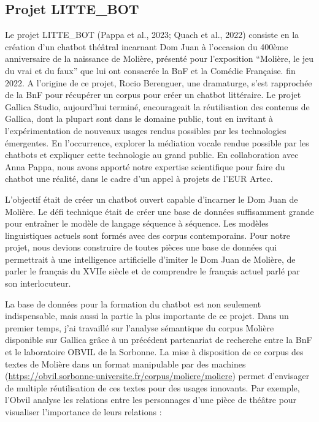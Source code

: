 \documentclass[
  a4paper,
  DIV=11,
  numbers=noendperiod]{scrreprt}
\begin{document}
\subsection{Projet LITTE\_BOT}\label{sec-projetLitteBot}

Le projet LITTE\_BOT (Pappa et al., 2023; Quach et al., 2022) consiste
en la création d'un chatbot théâtral incarnant Dom Juan à l'occasion du
400ème anniversaire de la naissance de Molière, présenté pour
l'exposition ``Molière, le jeu du vrai et du faux'' que lui ont
consacrée la BnF et la Comédie Française. fin 2022. A l'origine de ce
projet, Rocio Berenguer, une dramaturge, s'est rapprochée de la BnF pour
récupérer un corpus pour créer un chatbot littéraire. Le projet Gallica
Studio, aujourd'hui terminé, encourageait la réutilisation des contenus
de Gallica, dont la plupart sont dans le domaine public, tout en
invitant à l'expérimentation de nouveaux usages rendus possibles par les
technologies émergentes. En l'occurrence, explorer la médiation vocale
rendue possible par les chatbots et expliquer cette technologie au grand
public. En collaboration avec Anna Pappa, nous avons apporté notre
expertise scientifique pour faire du chatbot une réalité, dans le cadre
d'un appel à projets de l'EUR Artec.

L'objectif était de créer un chatbot ouvert capable d'incarner le Dom
Juan de Molière. Le défi technique était de créer une base de données
suffisamment grande pour entraîner le modèle de langage séquence à
séquence. Les modèles linguistiques actuels sont formés avec des corpus
contemporains. Pour notre projet, nous devions construire de toutes
pièces une base de données qui permettrait à une intelligence
artificielle d'imiter le Dom Juan de Molière, de parler le français du
XVIIe siècle et de comprendre le français actuel parlé par son
interlocuteur.

La base de données pour la formation du chatbot est non seulement
indispensable, mais aussi la partie la plus importante de ce projet.
Dans un premier temps, j'ai travaillé sur l'analyse sémantique du corpus
Molière disponible sur Gallica grâce à un précédent partenariat de
recherche entre la BnF et le laboratoire OBVIL de la Sorbonne. La mise à
disposition de ce corpus des textes de Molière dans un format
manipulable par des machines
(\url{https://obvil.sorbonne-universite.fr/corpus/moliere/moliere})
permet d'envisager de multiple réutilisation de ces textes pour des
usages innovants. Par exemple, l'Obvil analyse les relations entre les
personnages d'une pièce de théâtre pour visualiser l'importance de leurs
relations :
\end{document}
